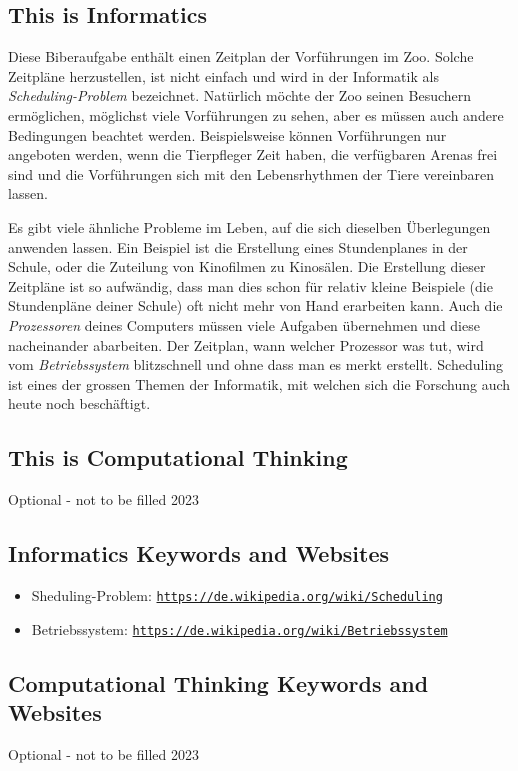 \documentclass[a4paper,11pt]{report}
\newcommand{\BrochureUrlText}[1]{\texttt{#1}}
\begin{document}
\subsection*{This is Informatics}

Diese Biberaufgabe enthält einen Zeitplan der Vorführungen im Zoo. Solche Zeitpläne herzustellen, ist nicht einfach und wird in der Informatik als \emph{Scheduling-Problem} bezeichnet. Natürlich möchte der Zoo seinen Besuchern ermöglichen, möglichst viele Vorführungen zu sehen, aber es müssen auch andere Bedingungen beachtet werden. Beispielsweise können Vorführungen nur angeboten werden, wenn die Tierpfleger Zeit haben, die verfügbaren Arenas frei sind und die Vorführungen sich mit den Lebensrhythmen der Tiere vereinbaren lassen.

Es gibt viele ähnliche Probleme im Leben, auf die sich dieselben Überlegungen anwenden lassen. Ein Beispiel ist die Erstellung eines Stundenplanes in der Schule, oder die Zuteilung von Kinofilmen zu Kinosälen. Die Erstellung dieser Zeitpläne ist so aufwändig, dass man dies schon für relativ kleine Beispiele (die Stundenpläne deiner Schule) oft nicht mehr von Hand erarbeiten kann. Auch die \emph{Prozessoren} deines Computers müssen viele Aufgaben übernehmen und diese nacheinander abarbeiten. Der Zeitplan, wann welcher Prozessor was tut, wird vom \emph{Betriebssystem} blitzschnell und ohne dass man es merkt erstellt. Scheduling ist eines der grossen Themen der Informatik, mit welchen sich die Forschung auch heute noch beschäftigt.


\subsection*{This is Computational Thinking}

Optional - not to be filled 2023


\subsection*{Informatics Keywords and Websites}

\begin{itemize}
  \item Sheduling-Problem: \href{https://de.wikipedia.org/wiki/Scheduling}{\BrochureUrlText{https://de.wikipedia.org/wiki/Scheduling}}
  \item Betriebssystem: \href{https://de.wikipedia.org/wiki/Betriebssystem}{\BrochureUrlText{https://de.wikipedia.org/wiki/Betriebssystem}}
\end{itemize}


\subsection*{Computational Thinking Keywords and Websites}

Optional - not to be filled 2023
\end{document}
